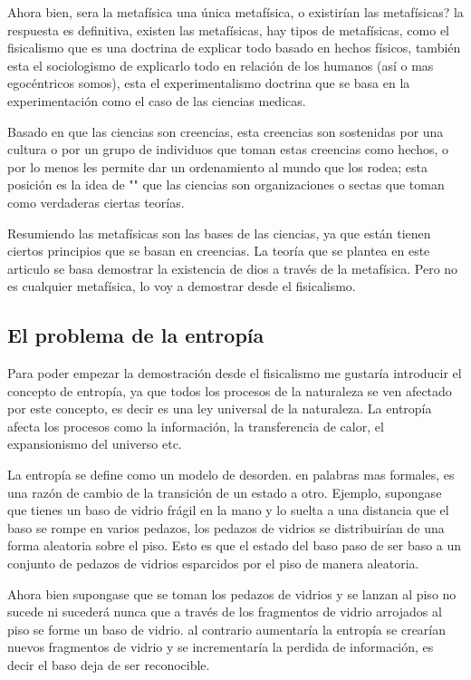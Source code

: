 \documentclass[12pt,letterpaper, a4paper ]{article}
\begin{document}
 Ahora bien, sera la metafísica una única metafísica, o existirían las metafísicas? la respuesta es definitiva, existen las metafísicas, hay tipos de metafísicas, como el fisicalismo que es una doctrina de explicar todo
 basado en hechos físicos, también esta el sociologismo de explicarlo todo en relación de los humanos (así o mas egocéntricos somos), esta el experimentalismo doctrina que se basa en la experimentación como el caso de las ciencias medicas.
 
 Basado en que las ciencias son creencias, esta creencias son sostenidas por una cultura o por un grupo de individuos que toman estas creencias como hechos, o por lo menos les permite dar un ordenamiento al mundo que los rodea; esta posición es la idea de "" que las ciencias son organizaciones o sectas que toman como verdaderas ciertas teorías.
 
 Resumiendo las metafísicas son las bases de las ciencias, ya que están tienen ciertos principios que se basan en creencias. La teoría que se plantea en este articulo se basa demostrar la existencia de dios a través de la metafísica. Pero no es cualquier metafísica, lo voy a demostrar desde el fisicalismo.
 

\subsection{El problema de la entropía}

Para poder empezar la demostración desde el fisicalismo me gustaría introducir el concepto de entropía, ya que todos los procesos de la naturaleza se ven afectado por este concepto, es decir es una ley universal de la naturaleza.
La entropía afecta los procesos como la información, la transferencia de calor, el expansionismo del universo etc.

La entropía se define como un modelo de desorden. en palabras mas formales, es una razón de cambio de la transición de un estado a otro. Ejemplo, supongase que tienes un baso de vidrio frágil en la mano y lo suelta a una distancia que el baso se rompe en varios pedazos,
los pedazos de vidrios se distribuirían de una forma aleatoria sobre el piso. Esto es que el estado del baso paso de ser baso a un conjunto de pedazos de vidrios esparcidos por el piso de manera aleatoria.

Ahora bien supongase que se toman los pedazos de vidrios y se lanzan al piso
no sucede ni sucederá nunca que a través de los fragmentos de vidrio arrojados al piso se forme un baso de vidrio. al contrario aumentaría la entropía se crearían nuevos fragmentos de vidrio y se incrementaría la perdida de información, es decir el baso deja de ser reconocible.
\end{document}

